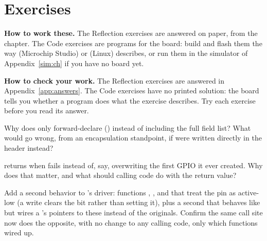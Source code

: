
\section{Exercises}
\label{c10:sec:exercises}\label{c10:app:b}

\begin{aside}
\textbf{How to work these.} The Reflection exercises are answered on paper, from the chapter. The
Code exercises are programs for the board: build and flash them the way 
(Microchip Studio) or  (Linux) describes, or run them in the simulator of
Appendix~\ref{sim:ch} if you have no board yet.

\textbf{How to check your work.} The Reflection exercises are answered in
Appendix~\ref{app:answers}. The Code exercises have no printed solution: the board tells you
whether a program does what the exercise describes. Try each exercise before you read its answer.
\end{aside}

\label{c10:set:1}

\label{c10:ex:1}
Why does  only forward-declare  ()
instead of including the full field list? What would go wrong, from an encapsulation standpoint, if
 were written directly in the header instead?

\label{c10:ex:2}
 returns  when  fails instead of, say, overwriting
the first GPIO it ever created. Why does that matter, and what should calling code do with the
return value?

\label{c10:set:2}

\label{c10:ex:3}
Add a second behavior to 's driver:  functions
, , and  that
treat the pin as active-low (a  write clears the bit rather than setting it), plus a
second  that behaves like
 but wires a 's pointers to these instead of the originals. Confirm
the same  call site now does the opposite, with no change to any
calling code, only which functions  wired up.

